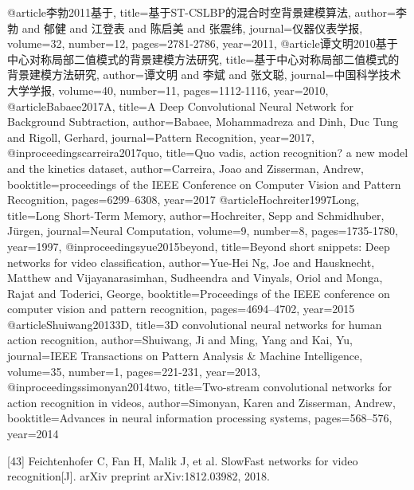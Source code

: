 \documentclass[]{article}
\begin{document}
@article{李勃2011基于,
	title={基于ST-CSLBP的混合时空背景建模算法},
	author={李勃 and 郁健 and 江登表 and 陈启美 and 张震纬},
	journal={仪器仪表学报},
	volume={32},
	number={12},
	pages={2781-2786},
	year={2011},
}
@article{谭文明2010基于中心对称局部二值模式的背景建模方法研究,
	title={基于中心对称局部二值模式的背景建模方法研究},
	author={谭文明 and 李斌 and 张文聪},
	journal={中国科学技术大学学报},
	volume={40},
	number={11},
	pages={1112-1116},
	year={2010},
}
@article{Babaee2017A,
	title={A Deep Convolutional Neural Network for Background Subtraction},
	author={Babaee, Mohammadreza and Dinh, Duc Tung and Rigoll, Gerhard},
	journal={Pattern Recognition},
	year={2017},
}
@inproceedings{carreira2017quo,
	title={Quo vadis, action recognition? a new model and the kinetics dataset},
	author={Carreira, Joao and Zisserman, Andrew},
	booktitle={proceedings of the IEEE Conference on Computer Vision and Pattern Recognition},
	pages={6299--6308},
	year={2017}
}
@article{Hochreiter1997Long,
	title={Long Short-Term Memory},
	author={Hochreiter, Sepp and Schmidhuber, Jürgen},
	journal={Neural Computation},
	volume={9},
	number={8},
	pages={1735-1780},
	year={1997},
}
@inproceedings{yue2015beyond,
	title={Beyond short snippets: Deep networks for video classification},
	author={Yue-Hei Ng, Joe and Hausknecht, Matthew and Vijayanarasimhan, Sudheendra and Vinyals, Oriol and Monga, Rajat and Toderici, George},
	booktitle={Proceedings of the IEEE conference on computer vision and pattern recognition},
	pages={4694--4702},
	year={2015}
}
@article{Shuiwang20133D,
	title={3D convolutional neural networks for human action recognition},
	author={Shuiwang, Ji and Ming, Yang and Kai, Yu},
	journal={IEEE Transactions on Pattern Analysis & Machine Intelligence},
	volume={35},
	number={1},
	pages={221-231},
	year={2013},
}
@inproceedings{simonyan2014two,
	title={Two-stream convolutional networks for action recognition in videos},
	author={Simonyan, Karen and Zisserman, Andrew},
	booktitle={Advances in neural information processing systems},
	pages={568--576},
	year={2014}
}

[43] Feichtenhofer C, Fan H, Malik J, et al. SlowFast networks for video recognition[J]. arXiv preprint arXiv:1812.03982, 2018.
\end{document}
